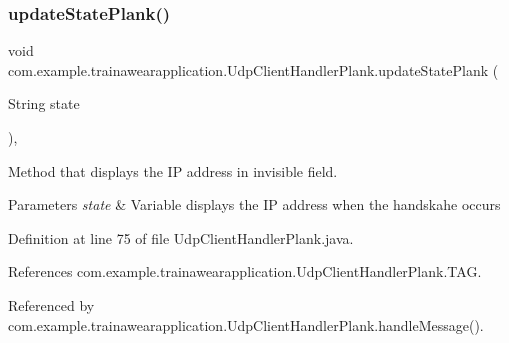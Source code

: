 \mbox{\label{classcom_1_1example_1_1trainawearapplication_1_1_udp_client_handler_plank_a68ceca8349b52704db25834ca5eb5b38}} 
\subsubsection{\texorpdfstring{updateStatePlank()}{updateStatePlank()}}
{\footnotesize\ttfamily void com.\+example.\+trainawearapplication.\+Udp\+Client\+Handler\+Plank.\+update\+State\+Plank (\begin{DoxyParamCaption}\item[{String}]{state }\end{DoxyParamCaption})\hspace{0.3cm}{\ttfamily [inline]}, {\ttfamily [private]}}



Method that displays the IP address in invisible field. 


\begin{DoxyParams}{Parameters}
{\em state} & Variable displays the IP address when the handskahe occurs \\
\hline
\end{DoxyParams}


Definition at line 75 of file Udp\+Client\+Handler\+Plank.\+java.


\begin{DoxyCode}{0}

\end{DoxyCode}


References com.\+example.\+trainawearapplication.\+Udp\+Client\+Handler\+Plank.\+T\+AG.



Referenced by com.\+example.\+trainawearapplication.\+Udp\+Client\+Handler\+Plank.\+handle\+Message().



